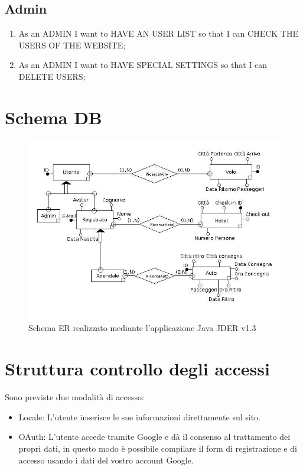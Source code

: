 \documentclass[11pt]{article}
\begin{document}
\subsection{Admin}
\begin{enumerate}
	\item As an ADMIN I want to HAVE AN USER LIST so that I can CHECK THE USERS OF THE WEBSITE;
	\item As an ADMIN I want to HAVE SPECIAL SETTINGS so that I can DELETE USERS;
\end{enumerate}

\pagebreak

\section{Schema DB}
\begin{figure}[!ht]
	\includegraphics[width=1.2\textwidth]{progetto} %
	\caption{Schema ER realizzato mediante l'applicazione Java JDER v1.3}
	\label{fig:schemaer}
\end{figure}


\section{Struttura controllo degli accessi}
Sono previste due modalità di accesso:
\begin{itemize}
	\item Locale: L’utente inserisce le sue informazioni direttamente sul sito.
	\item OAuth: L’utente accede tramite Google e dà il consenso al trattamento dei propri dati, in questo modo è possibile compilare il form di registrazione e di accesso usando i dati del vostro account Google.
\end{itemize}
\end{document}
